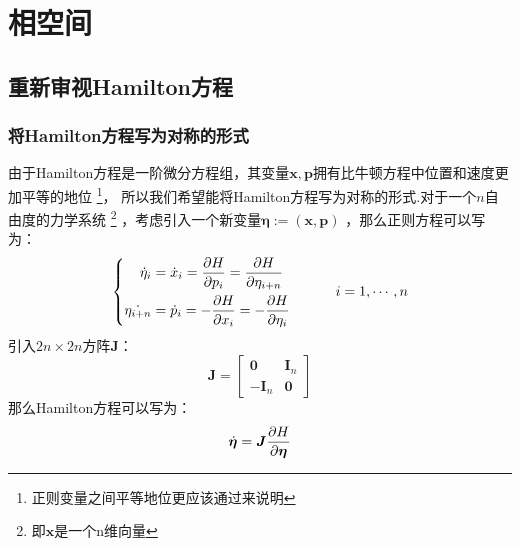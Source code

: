 \chapter{相空间}
    \section{重新审视Hamilton方程}
    \subsection{将Hamilton方程写为对称的形式}
    由于Hamilton方程是一阶微分方程组，其变量$\bm{x},\bm{p}$拥有比牛顿方程中位置和速度更加平等的地位
    \footnote{正则变量之间平等地位更应该通过\cite{Goldstein2000Classical}来说明}，
    所以我们希望能将Hamilton方程写为对称的形式.对于一个$n$自由度的力学系统
    \footnote{
        即$\bm{x}$是一个n维向量
    }
    ，考虑引入一个新变量$\bm{\eta}:= (\bm{x}, \bm{p})$
    ，那么正则方程可以写为：
    \begin{equation}
        \left\{
        \begin{split}
            \dot{\eta}_{i} &= \dot{x}_i = \frac{\partial{H}}{\partial{p_i}} = \frac{\partial{H}}{\partial{\eta_{i+n}}}\\
            \dot{\eta_{i+n}} &= \dot{p}_i = - \frac{\partial{H}}{\partial{x_i}} = -\frac{\partial{H}}{\partial{\eta_{i}}}
        \end{split}
        \right.
        \quad\quad\quad i = 1,\cdots, n
    \end{equation}
    引入$2n\times 2n$方阵$\bm{J}$：
    \begin{equation}
        \bm{J} = 
        \begin{bmatrix}
            \bm{0} & \bm{I}_n\\
            -\bm{I}_n & \bm{0}
        \end{bmatrix}
    \end{equation}
    那么Hamilton方程可以写为：
    \begin{equation}
        \dot{\bm{\eta}} = \bm{J}\frac{\partial{H}}{\partial{\bm{\eta}}}
        \label{canonical equation}
    \end{equation}
